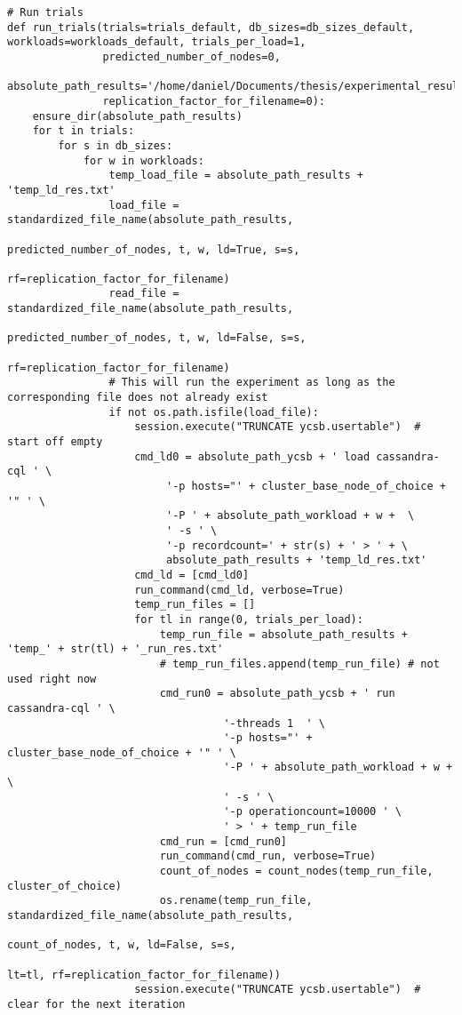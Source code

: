\begin{verbatim}
# Run trials
def run_trials(trials=trials_default, db_sizes=db_sizes_default, workloads=workloads_default, trials_per_load=1,
               predicted_number_of_nodes=0,
               absolute_path_results='/home/daniel/Documents/thesis/experimental_results/',
               replication_factor_for_filename=0):
    ensure_dir(absolute_path_results)
    for t in trials:
        for s in db_sizes:
            for w in workloads:
                temp_load_file = absolute_path_results + 'temp_ld_res.txt'
                load_file = standardized_file_name(absolute_path_results,
                                                   predicted_number_of_nodes, t, w, ld=True, s=s,
                                                   rf=replication_factor_for_filename)
                read_file = standardized_file_name(absolute_path_results,
                                                   predicted_number_of_nodes, t, w, ld=False, s=s,
                                                   rf=replication_factor_for_filename)
                # This will run the experiment as long as the corresponding file does not already exist
                if not os.path.isfile(load_file):
                    session.execute("TRUNCATE ycsb.usertable")  # start off empty
                    cmd_ld0 = absolute_path_ycsb + ' load cassandra-cql ' \
                         '-p hosts="' + cluster_base_node_of_choice + '" ' \
                         '-P ' + absolute_path_workload + w +  \
                         ' -s ' \
                         '-p recordcount=' + str(s) + ' > ' + \
                         absolute_path_results + 'temp_ld_res.txt'
                    cmd_ld = [cmd_ld0]
                    run_command(cmd_ld, verbose=True)
                    temp_run_files = []
                    for tl in range(0, trials_per_load):
                        temp_run_file = absolute_path_results + 'temp_' + str(tl) + '_run_res.txt'
                        # temp_run_files.append(temp_run_file) # not used right now
                        cmd_run0 = absolute_path_ycsb + ' run  cassandra-cql ' \
                                  '-threads 1  ' \
                                  '-p hosts="' + cluster_base_node_of_choice + '" ' \
                                  '-P ' + absolute_path_workload + w + \
                                  ' -s ' \
                                  '-p operationcount=10000 ' \
                                  ' > ' + temp_run_file
                        cmd_run = [cmd_run0]
                        run_command(cmd_run, verbose=True)
                        count_of_nodes = count_nodes(temp_run_file, cluster_of_choice)
                        os.rename(temp_run_file, standardized_file_name(absolute_path_results,
                                                                        count_of_nodes, t, w, ld=False, s=s,
                                                                        lt=tl, rf=replication_factor_for_filename))
                    session.execute("TRUNCATE ycsb.usertable")  # clear for the next iteration


\end{verbatim}
